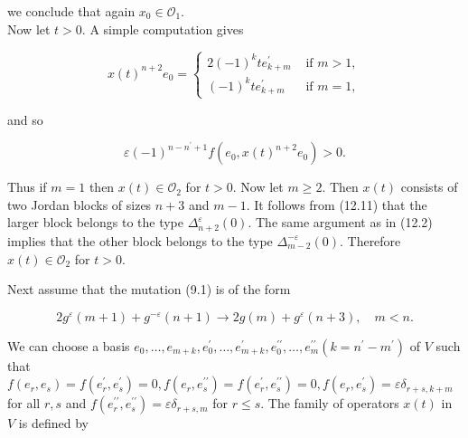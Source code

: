 \documentclass[10pt]{article}
\begin{document}
we conclude that again $x_{0} \in \mathcal{O}_{1}$.\\
Now let $t>0$. A simple computation gives

$$
x(t)^{n+2} e_{0}= \begin{cases}2(-1)^{k} t e_{k+m}^{\prime} & \text { if } m>1, \\ (-1)^{k} t e_{k+m}^{\prime} & \text { if } m=1,\end{cases}
$$

and so


\begin{equation*}
\varepsilon(-1)^{n-n^{\prime}+1} f\left(e_{0}, x(t)^{n+2} e_{0}\right)>0 . \tag{12.11}
\end{equation*}


Thus if $m=1$ then $x(t) \in \mathcal{O}_{2}$ for $t>0$. Now let $m \geqslant 2$. Then $x(t)$ consists of two Jordan blocks of sizes $n+3$ and $m-1$. It follows from (12.11) that the larger block belongs to the type $\Delta_{n+2}^{\varepsilon}(0)$. The same argument as in (12.2) implies that the other block belongs to the type $\Delta_{m-2}^{-\varepsilon}(0)$. Therefore $x(t) \in \mathcal{O}_{2}$ for $t>0$.

Next assume that the mutation (9.1) is of the form


\begin{equation*}
2 g^{\varepsilon}(m+1)+g^{-\varepsilon}(n+1) \rightarrow 2 g(m)+g^{\varepsilon}(n+3), \quad m<n . \tag{12.12}
\end{equation*}


We can choose a basis $e_{0}, \ldots, e_{m+k}, e_{0}^{\prime}, \ldots, e_{m+k}^{\prime}, e_{0}^{\prime \prime}, \ldots, e_{m}^{\prime \prime}\left(k=n^{\prime}-m^{\prime}\right)$ of $V$ such that $f\left(e_{r}, e_{s}\right)=f\left(e_{r}^{\prime}, e_{s}^{\prime}\right)=0, f\left(e_{r}, e_{s}^{\prime \prime}\right)=f\left(e_{r}^{\prime}, e_{s}^{\prime \prime}\right)=0, f\left(e_{r}, e_{s}^{\prime}\right)=\varepsilon \delta_{r+s, k+m}$ for all $r, s$ and $f\left(e_{r}^{\prime \prime}, e_{s}^{\prime \prime}\right)=\varepsilon \delta_{r+s, m}$ for $r \leqslant s$. The family of operators $x(t)$ in $V$ is defined by
\end{document}
